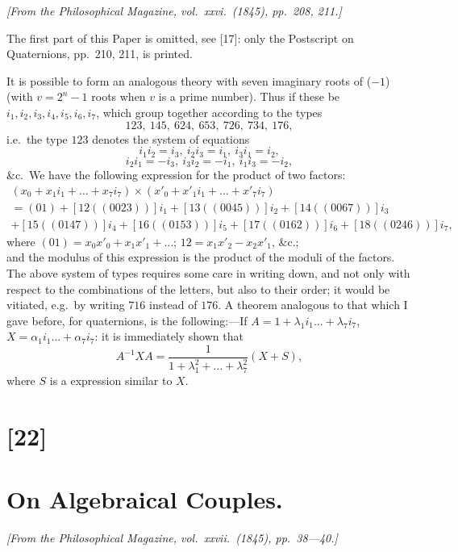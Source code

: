 \documentclass[12pt,a4paper]{article}
\begin{document}
\textit{[From the Philosophical Magazine, vol.~xxvi.~(1845), pp.~208, 211.]}

\bigskip
\setcounter{page}{127}

The first part of this Paper is omitted, see [17]: only the Postscript on Quaternions, pp.~210, 211, is printed.

It is possible to form an analogous theory with seven imaginary roots of ($-1$)
(with $v = 2^n - 1$ roots when $v$ is a prime number). Thus if these be $i_1, i_2, i_3, i_4, i_5, i_6, i_7$,
which group together according to the types
\[
123,\ 145,\ 624,\ 653,\ 726,\ 734,\ 176,
\]
i.e.\ the type $123$ denotes the system of equations
\[
i_1 i_2 = i_3,\ i_2 i_3 = i_1,\ i_3 i_1 = i_2,
\]
\[
i_2 i_1 = -i_3,\ i_3 i_2 = -i_1,\ i_1 i_3 = -i_2,
\]
\&c.\ We have the following expression for the product of two factors:
\begin{multline*}
(x_0 + x_1 i_1 + \ldots + x_7 i_7) \times (x'_0 + x'_1 i_1 + \ldots + x'_7 i_7)\\
= (01) + [12 ((0023))] i_1 + [13 ((0045))] i_2 + [14 ((0067))] i_3\\
+ [15 ((0147))] i_4 + [16 ((0153))] i_5 + [17 ((0162))] i_6 + [18 ((0246))] i_7,
\end{multline*}
where $(01) = x_0 x'_0 + x_1 x'_1 + \ldots$; $12 = x_1 x'_2 - x_2 x'_1$, \&c.;\\
and the modulus of this expression is the product of the moduli of the factors. The
above system of types requires some care in writing down, and not only with respect
to the combinations of the letters, but also to their order; it would be vitiated, e.g.\ by
writing $716$ instead of $176$. A theorem analogous to that which I gave before, for
quaternions, is the following:---If $A = 1 + \lambda_1 i_1 \ldots + \lambda_7 i_7$, $X = \alpha_1 i_1 \ldots + \alpha_7 i_7$: it is immediately
shown that
\[
A^{-1} X A = \frac{1}{1 + \lambda_1^2 + \ldots + \lambda_7^2} (X + S),
\]
where $S$ is a expression similar to $X$.

\newpage
\section*{[22]}
\section*{On Algebraical Couples.}

\textit{[From the Philosophical Magazine, vol.~xxvii.~(1845), pp.~38---40.]}
\end{document}

